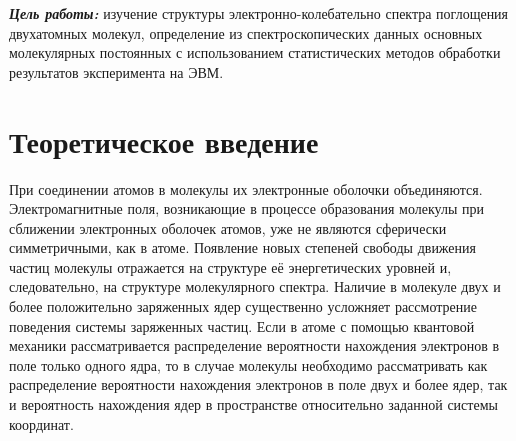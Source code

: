 \begin{center}
\end{center}

\textbf{\emph{Цель работы:}} изучение структуры электронно-колебательно спектра поглощения двухатомных молекул, определение из спектроскопических данных основных молекулярных постоянных с использованием статистических методов обработки результатов эксперимента на ЭВМ.
\section{Теоретическое введение}
При соединении атомов в молекулы их электронные оболочки объединяются.
Электромагнитные поля, возникающие в процессе образования молекулы при
сближении электронных оболочек атомов, уже не являются сферически
симметричными, как в атоме. Появление новых степеней свободы движения
частиц молекулы отражается на структуре её энергетических уровней и,
следовательно, на структуре молекулярного спектра. Наличие в молекуле двух
и более положительно заряженных ядер существенно усложняет рассмотрение
поведения системы заряженных частиц. Если в атоме с помощью квантовой
механики рассматривается распределение вероятности нахождения электронов
в поле только одного ядра, то в случае молекулы необходимо рассматривать
как распределение вероятности нахождения электронов в поле двух и более
ядер, так и вероятность нахождения ядер в пространстве относительно
заданной системы координат.

